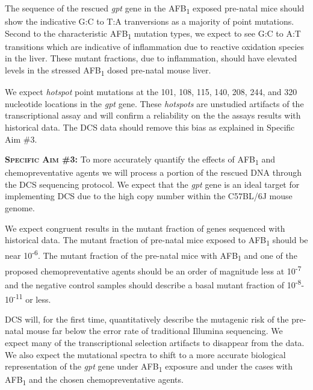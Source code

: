 \documentclass[12pt]{article}
\begin{document}
The sequence of the rescued \textit{gpt} gene in the AFB\textsubscript{1} exposed pre-natal mice should show the indicative G:C to T:A tranversions as a majority of point mutations.
Second to the characteristic AFB\textsubscript{1} mutation types, we expect to see G:C to A:T transitions which are indicative of inflammation due to reactive oxidation species in the liver.
These mutant fractions, due to inflammation, should have elevated levels in the stressed AFB\textsubscript{1} dosed pre-natal mouse liver.

We expect \emph{hotspot} point mutations at the 101, 108, 115, 140, 208, 244, and 320 nucleotide locations in the \textit{gpt} gene.
These \emph{hotspots} are unstudied artifacts of the transcriptional assay and will confirm a reliability on the the assays results with historical data. The DCS data should remove this bias as explained in Specific Aim \#3.

\vspace{5mm}\noindent\textbf{\textsc{Specific Aim \#3:}}
To more accurately quantify the effects of AFB\textsubscript{1} and chemopreventative agents we will process a portion of the rescued DNA through the DCS sequencing protocol. We expect that the \textit{gpt} gene is an ideal target for implementing DCS due to the high copy number within the C57BL/6J mouse genome.

We expect congruent results in the mutant fraction of genes sequenced with historical data.
The mutant fraction of pre-natal mice exposed to AFB\textsubscript{1} should be near 10\textsuperscript{-6}.
The mutant fraction of the pre-natal mice with AFB\textsubscript{1} and one of the proposed chemopreventative agents should be an order of magnitude less at 10\textsuperscript{-7} and the negative control samples should describe a basal mutant fraction of 10\textsuperscript{-8}-10\textsuperscript{-11} or less.

DCS will, for the first time, quantitatively describe the mutagenic risk of the pre-natal mouse far below the error rate of traditional Illumina sequencing.
We expect many of the transcriptional selection artifacts to disappear from the data.
We also expect the mutational spectra to shift to a more accurate biological representation of the \textit{gpt} gene under AFB\textsubscript{1} exposure and under the cases with AFB\textsubscript{1} and the chosen chemopreventative agents.

\end{document}
